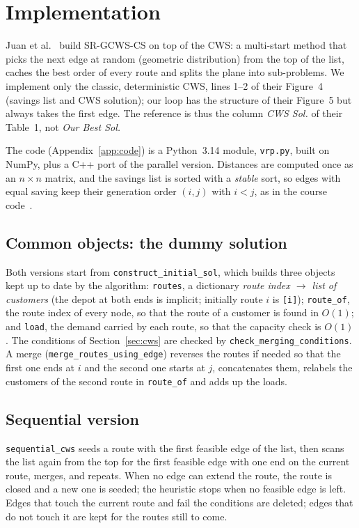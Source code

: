 \documentclass[10pt,a4paper]{article}
\begin{document}
\section{Implementation}
\label{sec:impl}

Juan et al.~\cite{juan2011} build SR-GCWS-CS on top of the CWS: a multi-start method that picks the next
edge at random (geometric distribution) from the top of the list, caches the best order of every route
and splits the plane into sub-problems. We implement only the classic, deterministic CWS, lines 1--2 of
their Figure~4 (savings list and CWS solution); our loop has the structure of their Figure~5 but always
takes the first edge. The reference is thus the column \emph{CWS Sol.} of their Table~1, not \emph{Our
Best Sol.}

The code (Appendix~\ref{app:code}) is a Python~3.14 module, \texttt{vrp.py}, built on NumPy, plus a
C++ port of the parallel version. Distances are computed once
as an $n\times n$ matrix, and the savings list is sorted with a \emph{stable} sort, so edges with equal
saving keep their generation order $(i,j)$ with $i<j$, as in the course code~\cite{slides}.

\subsection{Common objects: the dummy solution}

Both versions start from \texttt{construct\_initial\_sol}, which builds three objects kept up to date
by the algorithm: \texttt{routes}, a dictionary \emph{route index $\to$ list of customers} (the depot at
both ends is implicit; initially route $i$ is \texttt{[i]}); \texttt{route\_of}, the route index of
every node, so that the route of a customer is found in $O(1)$; and \texttt{load}, the demand carried by
each route, so that the capacity check is $O(1)$.
The conditions of Section~\ref{sec:cws} are checked by \texttt{check\_merging\_conditions}. A merge
(\texttt{merge\_routes\_using\_edge}) reverses the routes if needed so that the first one ends at $i$ and
the second one starts at $j$, concatenates them, relabels the customers of the second route in
\texttt{route\_of} and adds up the loads.

\subsection{Sequential version}

\texttt{sequential\_cws} seeds a route with the first feasible edge of the list, then scans the list again
from the top for the first feasible edge with one end on the current route, merges, and repeats. When no
edge can extend the route, the route is closed and a new one is seeded; the heuristic stops when no
feasible edge is left. Edges that touch the current route and fail the conditions are deleted; edges
that do not touch it are kept for the routes still to come.
\end{document}
